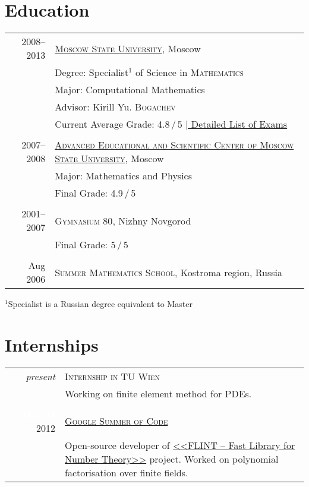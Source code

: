 \documentclass[a4paper,10pt]{article}
\begin{document}
\section{Education}
\begin{tabular}{r|p{13cm}}
 2008--2013 & \href{http://www.msu.ru/en/}{\textsc{Moscow State University}}, Moscow\\
 & Degree: Specialist$^1\!\!$ of Science in \textsc{Mathematics}\\
 & Major: Computational Mathematics\\
 & Advisor: Kirill Yu. \textsc{Bogachev}\\
 &\normalsize Current Average Grade: 4.8\,/\,5 \hyperlink{grds}{\hfill | \footnotesize Detailed List of Exams}\\

\multicolumn{2}{c}{} \\

 2007--2008& \href{http://www.aesc.msu.ru/}{\textsc{Advanced Educational and Scientific Center of Moscow State University}}, Moscow \\
 & Major: Mathematics and Physics \\
 &Final Grade: 4.9\,/\,5\\

\multicolumn{2}{c}{} \\

 2001--2007& \textsc{Gymnasium 80}, Nizhny Novgorod \\
 & Final Grade: 5\,/\,5\\

\multicolumn{2}{c}{} \\

 Aug 2006 & \textsc{Summer Mathematics School}, Kostroma region, Russia
\end{tabular}
\linebreak

\footnotesize{$^1$Specialist is a Russian degree equivalent to Master} \normalsize

\section{Internships}
\begin{tabular}{r|p{13cm}}
 \emph{present} & \textsc{Internship in TU Wien} \\
 & \footnotesize Working on finite element method for PDEs.\\
  
 \multicolumn{2}{c}{} \\

 \textcolor{white}{11111111} 2012 & 
 \href{https://google-melange.appspot.com/gsoc/project/google/gsoc2012/kulakova_lina/26001}{\textsc{Google Summer of Code}}\\
 & \footnotesize{Open-source developer of \href{https://github.com/lina-kulakova/flint2}{<<FLINT -- Fast Library for Number Theory>>} project.
 Worked on polynomial factorisation over finite fields.}
 
\end{tabular}
\end{document}
